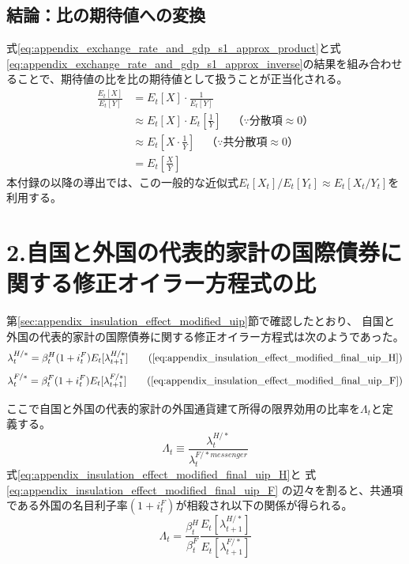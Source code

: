 \subsection*{結論：比の期待値への変換}
\label{sec:appendix_exchange_rate_and_gdp_s1_conclusion}

式\eqref{eq:appendix_exchange_rate_and_gdp_s1_approx_product}と式\eqref{eq:appendix_exchange_rate_and_gdp_s1_approx_inverse}の結果を組み合わせることで、期待値の比を比の期待値として扱うことが正当化される。
\begin{align}
    \frac{E_t[X]}{E_t[Y]}&=E_t[X]\cdot\frac{1}{E_t[Y]} \nonumber \\
    &\approx E_t[X]\cdot E_t\left[\frac{1}{Y}\right]\quad（\because\text{分散項}\approx0） \nonumber \\
    &\approx E_t\left[X\cdot\frac{1}{Y}\right]\quad（\because\text{共分散項}\approx0） \nonumber \\
    &=E_t\left[\frac{X}{Y}\right]
    \label{eq:appendix_exchange_rate_and_gdp_s1_ratio_final}
\end{align}
本付録の以降の導出では、この一般的な近似式\(E_t[X_t]/E_t[Y_t]\approx E_t[X_t/Y_t]\)を利用する。

\section*{2.自国と外国の代表的家計の国際債券に関する修正オイラー方程式の比}
\label{sec:appendix_exchange_rate_and_gdp_s2}
第\ref{sec:appendix_insulation_effect_modified_uip}節で確認したとおり、
自国と外国の代表的家計の国際債券に関する修正オイラー方程式は次のようであった。
\begin{equation}
    \lambda_t^{H/*}=\beta_t^H(1+i_t^F)E_t[\lambda_{t+1}^{H/*}]
    \tag{\ref{eq:appendix_insulation_effect_modified_final_uip_H}}
\end{equation}
\begin{equation}
    \lambda_t^{F/*}=\beta_t^F(1+i_t^F)E_t[\lambda_{t+1}^{F/*}]
    \tag{\ref{eq:appendix_insulation_effect_modified_final_uip_F}}
\end{equation}

ここで自国と外国の代表的家計の外国通貨建て所得の限界効用の比率を\(\Lambda_t\)と定義する。
\begin{equation}
    \Lambda_t\equiv\frac{\lambda_t^{H/*}}{\lambda_t^{F/* messenger}}
    \label{eq:appendix_exchange_rate_and_gdp_s2_lambda_ratio_def}
\end{equation}
式\eqref{eq:appendix_insulation_effect_modified_final_uip_H}と
式\eqref{eq:appendix_insulation_effect_modified_final_uip_F}
の辺々を割ると、共通項である外国の名目利子率\((1+i_t^F)\)が相殺され以下の関係が得られる。
\begin{equation}
    \Lambda_t=\frac{\beta_t^H}{\beta_t^F}\frac{E_t[\lambda_{t+1}^{H/*}]}{E_t[\lambda_{t+1}^{F/*}]}
    \label{eq:appendix_exchange_rate_and_gdp_s2_lambda_ratio_raw}
\end{equation}

